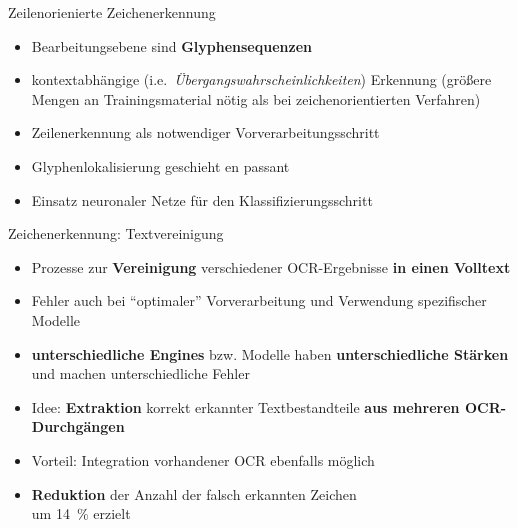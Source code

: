\documentclass{bbawslides}
\begin{document}
\begin{bbawslide}{Zeilenorienierte Zeichenerkennung}
  \vspace*{1.5em}%
  \begin{minipage}{1.05\textwidth}
    \begin{itemize}
      \item Bearbeitungsebene sind \textbf{Glyphensequenzen}
    \end{itemize}
  \end{minipage}
  \begin{center}
  \end{center}
  \begin{minipage}{1.05\textwidth}
    \begin{itemize}
      \item kontextabhängige (i.e.~\emph{Übergangswahrscheinlichkeiten}) Erkennung (größere Mengen an Trainingsmaterial nötig als bei zeichenorientierten Verfahren)
      \item Zeilenerkennung als notwendiger Vorverarbeitungsschritt
      \item Glyphenlokalisierung geschieht en passant
      \item Einsatz neuronaler Netze für den Klassifizierungsschritt
    \end{itemize}
  \end{minipage}
\end{bbawslide}

\begin{bbawslide}{Zeichenerkennung: Textvereinigung}
  \vspace*{7mm}%
  \centerslidestrue%
  \begin{itemize}
    \item Prozesse zur \textbf{Vereinigung} verschiedener OCR-Ergebnisse \textbf{in einen Volltext}
    \item Fehler auch bei \enquote{optimaler} Vorverarbeitung und Verwendung spezifischer Modelle
    \item \textbf{unterschiedliche Engines} bzw. Modelle haben \textbf{unterschiedliche Stärken} und machen unterschiedliche Fehler
    \item Idee: \textbf{Extraktion} korrekt erkannter Textbestandteile \textbf{aus mehreren OCR-Durchgängen} 
    \item Vorteil: Integration vorhandener OCR ebenfalls möglich
    \item \textbf{Reduktion} der Anzahl der falsch erkannten Zeichen\\um 14~\% erzielt  
  \end{itemize}
\end{bbawslide}
\end{document}
